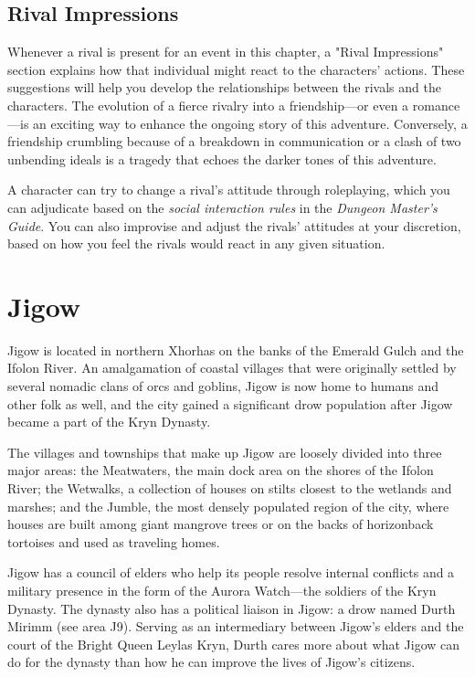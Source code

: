 \documentclass[10pt,a4paper,twoside,bg=print,twocolumn,openany,nodeprecatedcode]{dndbook}
\begin{document}
\subsection{Rival Impressions}
Whenever a rival is present for an event in this chapter, a "Rival Impressions" section explains how that individual might react to the characters' actions. These suggestions will help you develop the relationships between the rivals and the characters. The evolution of a fierce rivalry into a friendship—or even a romance—is an exciting way to enhance the ongoing story of this adventure. Conversely, a friendship crumbling because of a breakdown in communication or a clash of two unbending ideals is a tragedy that echoes the darker tones of this adventure.

A character can try to change a rival's attitude through roleplaying, which you can adjudicate based on the \textit{social interaction rules} in the \textit{Dungeon Master's Guide}. You can also improvise and adjust the rivals' attitudes at your discretion, based on how you feel the rivals would react in any given situation.

\section{Jigow}
Jigow is located in northern Xhorhas on the banks of the Emerald Gulch and the Ifolon River. An amalgamation of coastal villages that were originally settled by several nomadic clans of orcs and goblins, Jigow is now home to humans and other folk as well, and the city gained a significant drow population after Jigow became a part of the Kryn Dynasty.

The villages and townships that make up Jigow are loosely divided into three major areas: the Meatwaters, the main dock area on the shores of the Ifolon River; the Wetwalks, a collection of houses on stilts closest to the wetlands and marshes; and the Jumble, the most densely populated region of the city, where houses are built among giant mangrove trees or on the backs of horizonback tortoises and used as traveling homes.

Jigow has a council of elders who help its people resolve internal conflicts and a military presence in the form of the Aurora Watch—the soldiers of the Kryn Dynasty. The dynasty also has a political liaison in Jigow: a drow named Durth Mirimm (see area J9). Serving as an intermediary between Jigow's elders and the court of the Bright Queen Leylas Kryn, Durth cares more about what Jigow can do for the dynasty than how he can improve the lives of Jigow's citizens.
\end{document}
